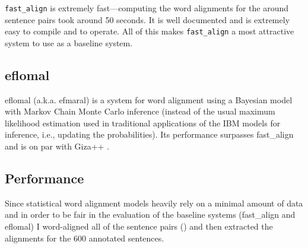 \texttt{fast\_align} is extremely fast---computing the word alignments for the around  sentence pairs took around 50 seconds. 
It is well documented and is extremely easy to compile and to operate. 
All of this makes \texttt{fast\_align} a most attractive system to use as a baseline system.

\subsection{eflomal}
eflomal (a.k.a. efmaral\footnotemark) is a system for word alignment using a Bayesian model with Markov Chain Monte Carlo inference (instead of the usual maximum likelihood estimation used in traditional applications of the IBM models for inference, i.e., updating the probabilities). 
Its performance surpasses fast\_align and is on par with Giza++ \autocite{Ostling2016efmaral}.



\subsection{Performance}
Since statistical word alignment models heavily rely on a minimal amount of data and in order to be fair in the evaluation of the baseline systems (fast\_align and eflomal) I word-aligned all of the sentence pairs () and then extracted the alignments for the 600 annotated sentences.
 


